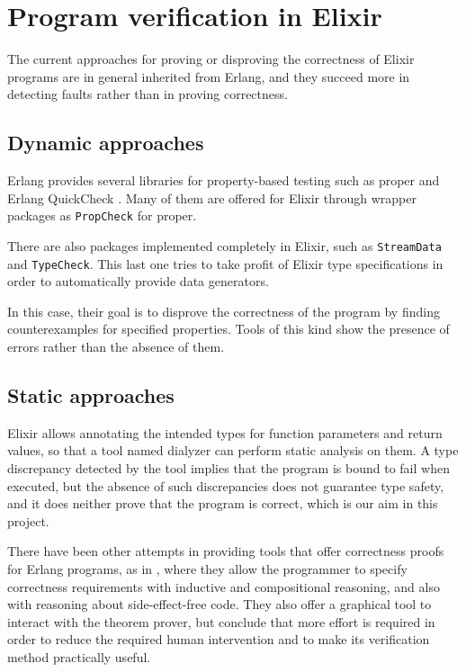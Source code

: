 \section{Program verification in Elixir}

The current approaches for proving or disproving the correctness of Elixir 
programs are in general inherited from Erlang, and they succeed more in 
detecting faults rather than in proving correctness.

\subsection{Dynamic approaches}

Erlang provides several libraries for property-based testing such as
\gls{proper} \citep{proper} and Erlang QuickCheck \citep{quickcheck}. Many of
them are offered for Elixir through wrapper packages as \verb|PropCheck| for
\gls{proper}.

There are also packages implemented completely in Elixir, such as
\verb|StreamData| and \verb|TypeCheck|. This last one tries to take profit of
Elixir type specifications in order to automatically provide data generators.

In this case, their goal is to disprove the correctness of the program by
finding counterexamples for specified properties. Tools of this kind show the
presence of errors rather than the absence of them.

\subsection{Static approaches}
\label{sec:static}

Elixir allows annotating the intended types for function parameters and return
values, so that a tool named \gls{dialyzer} \citep{Dialyzer} can perform static
analysis on them. A type discrepancy detected by the tool implies that the
program is bound to fail when executed, but the absence of such discrepancies
does not guarantee type safety, and it does neither prove that the program is
correct, which is our aim in this project.

There have been other attempts in providing tools that offer correctness proofs
for Erlang programs, as in \cite{erlangveri}, where they allow the programmer to
specify correctness requirements with inductive and compositional reasoning, and
also with reasoning about side-effect-free code. They also offer a graphical
tool to interact with the theorem prover, but conclude that more effort is
required in order to reduce the required human intervention and to make its
verification method practically useful.
